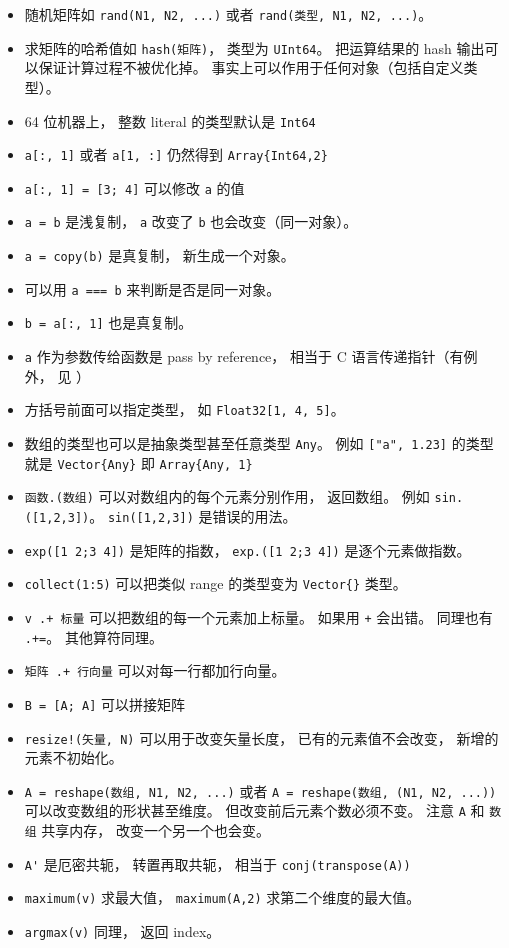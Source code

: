 \begin{itemize}
\item 随机矩阵如 \verb`rand(N1, N2, ...)` 或者 \verb`rand(类型, N1, N2, ...)`。
\item 求矩阵的哈希值如 \verb`hash(矩阵)`， 类型为 \verb`UInt64`。 把运算结果的 hash 输出可以保证计算过程不被优化掉。 事实上可以作用于任何对象（包括自定义类型）。
\item 64 位机器上， 整数 literal 的类型默认是 \verb`Int64`
\item \verb`a[:, 1]` 或者 \verb`a[1, :]` 仍然得到 \verb`Array{Int64,2}`
\item \verb`a[:, 1] = [3; 4]` 可以修改 \verb`a` 的值
\item \verb`a = b` 是浅复制， \verb`a` 改变了 \verb`b` 也会改变（同一对象）。
\item \verb`a = copy(b)` 是真复制， 新生成一个对象。
\item 可以用 \verb`a === b` 来判断是否是同一对象。
\item \verb`b = a[:, 1]` 也是真复制。
\item \verb`a` 作为参数传给函数是 pass by reference， 相当于 C 语言传递指针（有例外， 见 ）
\item 方括号前面可以指定类型， 如 \verb`Float32[1, 4, 5]`。
\item 数组的类型也可以是抽象类型甚至任意类型 \verb`Any`。 例如 \verb`["a", 1.23]` 的类型就是 \verb`Vector{Any}` 即 \verb`Array{Any, 1}`
\item \verb`函数.(数组)` 可以对数组内的每个元素分别作用， 返回数组。 例如 \verb`sin.([1,2,3])`。 \verb`sin([1,2,3])` 是错误的用法。
\item \verb`exp([1 2;3 4])` 是矩阵的指数， \verb`exp.([1 2;3 4])` 是逐个元素做指数。
\item \verb`collect(1:5)` 可以把类似 range 的类型变为 \verb`Vector{}` 类型。
\item \verb`v .+ 标量` 可以把数组的每一个元素加上标量。 如果用 \verb`+` 会出错。 同理也有 \verb`.+=`。 其他算符同理。
\item \verb`矩阵 .+ 行向量` 可以对每一行都加行向量。
\item \verb`B = [A; A]` 可以拼接矩阵
\item \verb`resize!(矢量, N)` 可以用于改变矢量长度， 已有的元素值不会改变， 新增的元素不初始化。
\item \verb`A = reshape(数组, N1, N2, ...)` 或者 \verb`A = reshape(数组, (N1, N2, ...))` 可以改变数组的形状甚至维度。 但改变前后元素个数必须不变。 注意 \verb`A` 和 \verb`数组` 共享内存， 改变一个另一个也会变。
\item \verb`A'` 是厄密共轭， 转置再取共轭， 相当于 \verb`conj(transpose(A))`
\item \verb`maximum(v)` 求最大值， \verb`maximum(A,2)` 求第二个维度的最大值。
\item \verb`argmax(v)` 同理， 返回 index。
\end{itemize}

